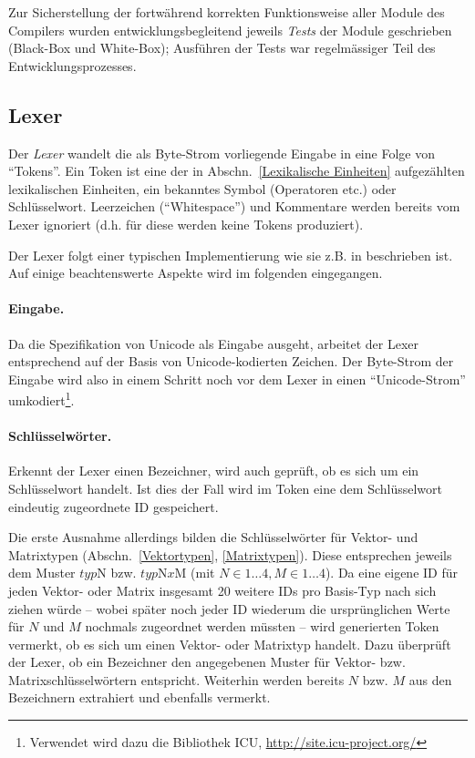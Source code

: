 \documentclass[twoside,a4paper,fleqn,12pt]{article}
\begin{document}
Zur Sicherstellung der fortwährend korrekten Funktionsweise aller Module des Compilers wurden entwicklungsbegleitend 
jeweils \emph{Tests} der Module geschrieben (Black-Box und White-Box); Ausführen der Tests war regelmässiger Teil des Entwicklungsprozesses.
 
\subsection{Lexer}

Der \emph{Lexer} wandelt die als Byte-Strom vorliegende Eingabe in eine Folge von "`Tokens"'.
Ein Token ist eine der in Abschn.~\ref{Lexikalische Einheiten} aufgezählten lexikalischen Einheiten, ein bekanntes Symbol (Operatoren etc.) oder Schlüsselwort. 
Leerzeichen (``Whitespace'') und Kommentare werden bereits vom Lexer ignoriert (d.h. für diese werden keine Tokens produziert).

Der Lexer folgt einer typischen Implementierung wie sie z.B. in \cite{wirth_compiler} beschrieben ist. Auf einige beachtenswerte Aspekte
wird im folgenden eingegangen.

\paragraph{Eingabe.} Da die Spezifikation von Unicode als Eingabe ausgeht, arbeitet der Lexer entsprechend auf der Basis von Unicode-kodierten Zeichen.
Der Byte-Strom der Eingabe wird also in einem Schritt noch vor dem Lexer in einen "`Unicode-Strom"' umkodiert\footnote{Verwendet wird dazu die Bibliothek ICU,
\url{http://site.icu-project.org/}}.

\paragraph{Schlüsselwörter.} Erkennt der Lexer einen Bezeichner, wird auch geprüft, ob es sich um ein Schlüsselwort handelt. Ist dies der Fall
wird im Token eine dem Schlüsselwort eindeutig zugeordnete ID gespeichert.

Die erste Ausnahme allerdings bilden die Schlüsselwörter für Vektor- und Matrixtypen (Abschn.~\ref{Vektortypen}, \ref{Matrixtypen}). Diese entsprechen
jeweils dem Muster $\mathit{typ}\mathrm{N}$ bzw. $\mathit{typ}\mathrm{N}\mathit{x}\mathrm{M}$ (mit $N \in 1 \dots 4, M \in 1 \dots 4$).
Da eine eigene ID für jeden Vektor- oder Matrix insgesamt 20 weitere IDs pro Basis-Typ nach sich ziehen würde -- wobei später noch jeder ID wiederum
die ursprünglichen Werte für $N$ und $M$ nochmals zugeordnet
werden müssten -- wird generierten Token vermerkt, ob es sich um einen Vektor- oder Matrixtyp handelt.
Dazu überprüft der Lexer, ob ein Bezeichner den angegebenen Muster für Vektor- bzw. Matrixschlüsselwörtern entspricht.
Weiterhin werden bereits $N$ bzw. $M$ aus den Bezeichnern extrahiert und ebenfalls vermerkt.
\end{document}
